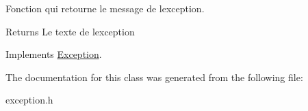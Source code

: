 Fonction qui retourne le message de l\textquotesingle{}exception. 

\begin{DoxyReturn}{Returns}
Le texte de l\textquotesingle{}exception 
\end{DoxyReturn}


Implements \hyperlink{class_exception_a73ce9dfab1e48800f8818978d014c106}{Exception}.



The documentation for this class was generated from the following file\+:\begin{DoxyCompactItemize}
\item 
exception.\+h\end{DoxyCompactItemize}
